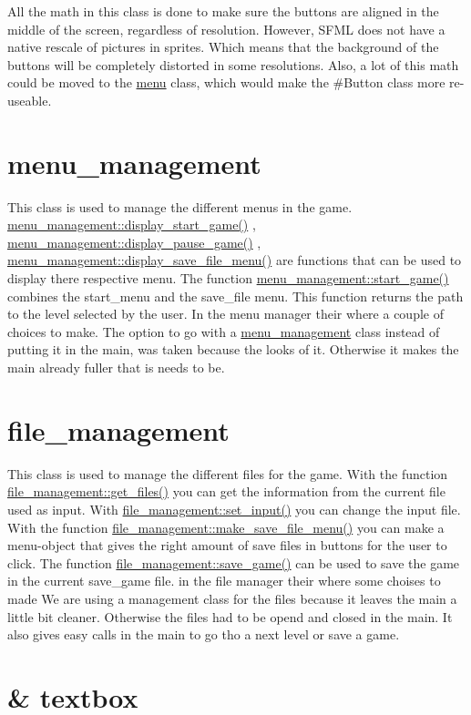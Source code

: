 All the math in this class is done to make sure the buttons are aligned in the middle of the screen, regardless of resolution. However, S\+F\+ML does not have a native rescale of pictures in sprites. Which means that the background of the buttons will be completely distorted in some resolutions. Also, a lot of this math could be moved to the \hyperlink{classmenu}{menu} class, which would make the \#\+Button class more re-\/useable.\hypertarget{index_menu_management}{}\section{menu\+\_\+management}\label{index_menu_management}
This class is used to manage the different menu\textquotesingle{}s in the game. \hyperlink{classmenu__management_aad6e975e03cab2478f3ebec8da7eaf7d}{menu\+\_\+management\+::display\+\_\+start\+\_\+game()} , \hyperlink{classmenu__management_ab7aa6674e3428604073af06efe5aa791}{menu\+\_\+management\+::display\+\_\+pause\+\_\+game()} , \hyperlink{classmenu__management_ac64c1eace3d955be8623a1129597dc54}{menu\+\_\+management\+::display\+\_\+save\+\_\+file\+\_\+menu()} are functions that can be used to display there respective menu. The function \hyperlink{classmenu__management_a92d22f059d33ccc5c3ae485804fd5fbb}{menu\+\_\+management\+::start\+\_\+game()} combines the start\+\_\+menu and the save\+\_\+file menu. This function returns the path to the level selected by the user. In the menu manager their where a couple of choices to make. The option to go with a \hyperlink{classmenu__management}{menu\+\_\+management} class instead of putting it in the main, was taken because the looks of it. Otherwise it makes the main already fuller that is needs to be.\hypertarget{index_file_management}{}\section{file\+\_\+management}\label{index_file_management}
This class is used to manage the different files for the game. With the function \hyperlink{classfile__management_a6c3f90ce958156adea878510097d64ef}{file\+\_\+management\+::get\+\_\+files()} you can get the information from the current file used as input. With \hyperlink{classfile__management_a090d9aba4dd5a795428ccbfe8d4037e6}{file\+\_\+management\+::set\+\_\+input()} you can change the input file. With the function \hyperlink{classfile__management_a97eda13bca5dbe703663bf81f83a77a0}{file\+\_\+management\+::make\+\_\+save\+\_\+file\+\_\+menu()} you can make a menu-\/object that gives the right amount of save files in buttons for the user to click. The function \hyperlink{classfile__management_a79e6ae7cec63aa959d7d0730d6ffa5a3}{file\+\_\+management\+::save\+\_\+game()} can be used to save the game in the current save\+\_\+game file. in the file manager their where some choises to made We are using a management class for the files because it leaves the main a little bit cleaner. Otherwise the files had to be opend and closed in the main. It also gives easy calls in the main to go tho a next level or save a game.\hypertarget{index_cutscene1}{}\section{\& textbox}\label{index_cutscene1}
